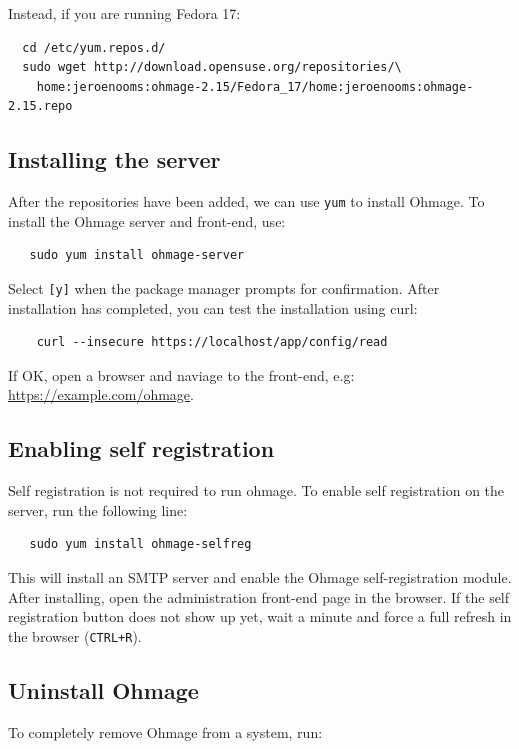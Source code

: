 \documentclass{scrartcl}
\begin{document}
\noindent Instead, if you are running Fedora 17:

\begin{verbatim}
  cd /etc/yum.repos.d/
  sudo wget http://download.opensuse.org/repositories/\
    home:jeroenooms:ohmage-2.15/Fedora_17/home:jeroenooms:ohmage-2.15.repo
\end{verbatim}

\subsection{Installing the server}

After the repositories have been added, we can use \texttt{yum} to install
Ohmage. To install the Ohmage server and front-end, use:

\begin{verbatim}
   sudo yum install ohmage-server
\end{verbatim}

\noindent Select \texttt{[y]} when the package manager prompts for confirmation.
After installation has completed, you can test the installation using curl:

\begin{verbatim}
    curl --insecure https://localhost/app/config/read
\end{verbatim}

\noindent If OK, open a browser and naviage to the front-end, e.g:
\url{https://example.com/ohmage}.

\subsection{Enabling self registration}

Self registration is not required to run ohmage. To enable self registration on
the server, run the following line:
\begin{verbatim}
   sudo yum install ohmage-selfreg
\end{verbatim}
This will install an SMTP server and enable the Ohmage self-registration module.
After installing, open the administration front-end page in the browser. If the
self registration button does not show up yet, wait a minute and force a full
refresh in the browser (\texttt{CTRL+R}).

\subsection{Uninstall Ohmage}

To completely remove Ohmage from a system, run:
\end{document}
